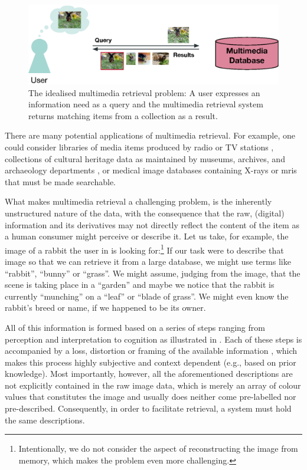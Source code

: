 \begin{figure}[tb]
    \centering
    \includegraphics[width=\textwidth]{figures/mr-ideal.eps}
    \caption{The idealised multimedia retrieval problem: A user expresses an information need as a query and the multimedia retrieval system returns matching items from a collection as a result.}
    \label{figure:mr-ideal}
\end{figure}

There are many potential applications of multimedia retrieval. For example, one could consider libraries of media items produced by radio or TV stations \cite{Watanabe:1998Multimedia}, collections of cultural heritage data as maintained by museums, archives, and archaeology departments \cite{Tsai:2007Review}, or medical image databases containing X-rays or \acrshort{mri}s \cite{Mueller:2004Review} that must be made searchable.

What makes multimedia retrieval a challenging problem, is the inherently unstructured nature of the data, with the consequence that the raw, (digital) information and its derivatives may not directly reflect the content of the item as a human consumer might perceive or describe it. Let us take, for example, the image of a rabbit the user in  is looking for:\footnote{Intentionally, we do not consider the aspect of reconstructing the image from memory, which makes the problem even more challenging.} If our task were to describe that image so that we can retrieve it from a large database, we might use terms like ``rabbit'', ``bunny'' or ``grass''. We might assume, judging from the image, that the scene is taking place in a ``garden'' and maybe we notice that the rabbit is currently ``munching'' on a ``leaf'' or ``blade of grass''. We might even know the rabbit's breed or name, if we happened to be its owner.

All of this information is formed based on a series of steps ranging from perception and interpretation to cognition as illustrated in . Each of these steps is accompanied by a loss, distortion or framing of the available information \cite{Javanmardi:2021Exploring}, which makes this process highly subjective and context dependent (e.g., based on prior knowledge). Most importantly, however, all the aforementioned descriptions are not explicitly contained in the raw image data, which is merely an array of colour values that constitutes the image and usually does neither come pre-labelled nor pre-described. Consequently, in order to facilitate retrieval, a system must hold the same descriptions. 

